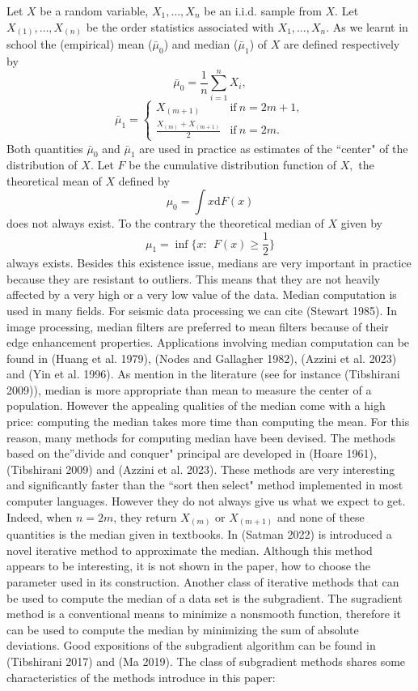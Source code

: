 \documentclass[
  11pt,
  a4paper,
]{article}
\newcounter{none} %
\begin{document}
Let \(X\) be a random variable, \(X_1,\ldots,X_n\) be an i.i.d. sample
from \(X.\) Let \(X_{(1)},\ldots,X_{(n)}\) be the order statistics
associated with \(X_1,\ldots,X_n.\) As we learnt in school the
(empirical) mean (\(\bar{\mu}_0\)) and median (\(\bar{\mu}_1\)) of \(X\)
are defined respectively by \[\bar{\mu}_0=\frac{1}{n}\sum_{i=1}^n X_i,\]
\[\bar{\mu}_1   = \begin{cases}
	X_{(m+1)}  & \text{if}\  n=2m+1, \\
	\frac{X_{(m)}+X_{(m+1)}}{2} & \text{if}\ n=2m.
\end{cases}\] Both quantities \(\bar{\mu}_0\) and \(\bar{\mu}_1\)
are used in practice as estimates of the ``center" of the distribution
of \(X.\) Let \(F\) be the cumulative distribution function of \(X,\)
the theoretical mean of \(X\) defined by \[\mu_0=\int x \mathrm{d}F(x)\]
does not always exist. To the contrary the theoretical median of \(X\)
given by \[\mu_1=\inf\{ x:\ \  F(x)\ge \frac{1}{2}\}\] always exists.
Besides this existence issue, medians are very important in practice
because they are resistant to outliers. This means that they are not
heavily affected by a very high or a very low value of the data. Median
computation is used in many fields. For seismic data processing we can
cite (Stewart 1985). In image processing, median filters are preferred
to mean filters because of their edge enhancement properties.
Applications involving median computation can be found in (Huang et al.
1979), (Nodes and Gallagher 1982), (Azzini et al. 2023) and (Yin et al.
1996). As mention in the literature (see for instance (Tibshirani
2009)), median is more appropriate than mean to measure the center of a
population. However the appealing qualities of the median come with a
high price: computing the median takes more time than computing the
mean. For this reason, many methods for computing median have been
devised. The methods based on the''divide and conquer" principal are
developed in (Hoare 1961), (Tibshirani 2009) and (Azzini et al. 2023).
These methods are very interesting and significantly faster than the
``sort then select" method implemented in most computer languages.
However they do not always give us what we expect to get. Indeed, when
\(n=2m\), they return \(X_{(m)}\) or \(X_{(m+1)}\) and none of these
quantities is the median given in textbooks. In (Satman 2022) is
introduced a novel iterative method to approximate the median. Although
this method appears to be interesting, it is not shown in the paper, how
to choose the parameter used in its construction. Another class of
iterative methods that can be used to compute the median of a data set
is the subgradient. The sugradient method is a conventional means to
minimize a nonsmooth function, therefore it can be used to compute the
median by minimizing the sum of absolute deviations. Good expositions of
the subgradient algorithm can be found in (Tibshirani 2017) and (Ma
2019). The class of subgradient methods shares some characteristics of
the methods introduce in this paper:
\end{document}
